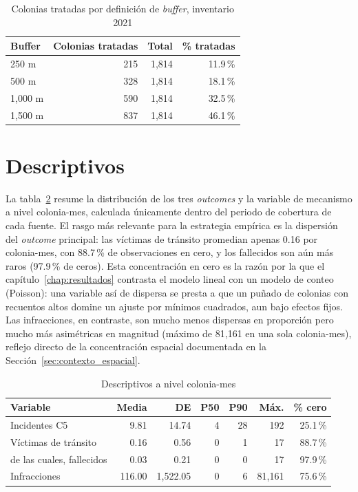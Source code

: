 \begin{table}[H]
  \centering
  \caption{Colonias tratadas por definición de \emph{buffer}, inventario 2021}
  \label{tab:tratamiento_buffer}
  \begin{tabular}{lrrr}
    \toprule
    Buffer & Colonias tratadas & Total & \% tratadas \\
    \midrule
    250 m  & 215 & 1{,}814 & 11.9\,\% \\
    500 m  & 328 & 1{,}814 & 18.1\,\% \\
    1{,}000 m & 590 & 1{,}814 & 32.5\,\% \\
    1{,}500 m & 837 & 1{,}814 & 46.1\,\% \\
    \bottomrule
  \end{tabular}
\end{table}

\section{Descriptivos}
\label{sec:datos_descriptivos}

La tabla~\ref{tab:descriptivos} resume la distribución de los tres
\emph{outcomes} y la variable de mecanismo a nivel colonia-mes, calculada
únicamente dentro del periodo de cobertura de cada fuente. El rasgo más
relevante para la estrategia empírica es la dispersión del \emph{outcome}
principal: las víctimas de tránsito promedian apenas 0.16 por colonia-mes, con
88.7\,\% de observaciones en cero, y los fallecidos son aún más raros
(97.9\,\% de ceros). Esta concentración en cero es la razón por la que el
capítulo~\ref{chap:resultados} contrasta el modelo lineal con un modelo de
conteo (Poisson): una variable así de dispersa se presta a que un puñado de
colonias con recuentos altos domine un ajuste por mínimos cuadrados, aun bajo
efectos fijos. Las infracciones, en contraste, son mucho menos dispersas en
proporción pero mucho más asimétricas en magnitud (máximo de 81{,}161 en una
sola colonia-mes), reflejo directo de la concentración espacial documentada
en la Sección~\ref{sec:contexto_espacial}.

\begin{table}[H]
  \centering
  \caption{Descriptivos a nivel colonia-mes}
  \label{tab:descriptivos}
  \begin{tabular}{lrrrrrr}
    \toprule
    Variable & Media & DE & P50 & P90 & Máx. & \% cero \\
    \midrule
    Incidentes C5        & 9.81   & 14.74   & 4 & 28 & 192    & 25.1\,\% \\
    Víctimas de tránsito  & 0.16   & 0.56    & 0 & 1  & 17     & 88.7\,\% \\
    \quad de las cuales, fallecidos & 0.03 & 0.21 & 0 & 0 & 17 & 97.9\,\% \\
    Infracciones          & 116.00 & 1{,}522.05 & 0 & 6 & 81{,}161 & 75.6\,\% \\
    \bottomrule
  \end{tabular}
\end{table}

